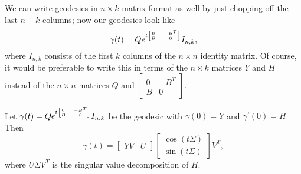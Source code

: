We can write geodesics in $n \times k$ matrix format as well by just chopping off the last $n-k$ columns; now our geodesics look like
\[
	\gamma(t) = Qe^{t{\tiny\begin{bmatrix} 0 & -B^T \\ B & 0 \end{bmatrix}}} I_{n,k},
\]
where $I_{n,k}$ consists of the first $k$ columns of the $n \times n $ identity matrix. Of course, it would be preferable to write this in terms of the $n \times k$ matrices $Y$ and $H$ instead of the $n \times n$ matrices $Q$ and $\begin{bmatrix} 0 & -B^T \\ B & 0 \end{bmatrix}$. 

\begin{theorem}\label{thm:grassmann geodesics}
	Let $\gamma(t) = Qe^{t{\tiny\begin{bmatrix} 0 & -B^T \\ B & 0 \end{bmatrix}}} I_{n,k}$ be the geodesic with $\gamma(0) = Y$ and $\gamma'(0) = H$. Then
	\[
		\gamma(t) = \begin{bmatrix} YV & U \end{bmatrix} \begin{bmatrix} \cos (t\Sigma) \\ \sin (t\Sigma) \end{bmatrix} V^T,
	\]
	where $U \Sigma V^T$ is the singular value decomposition of $H$.
\end{theorem}

